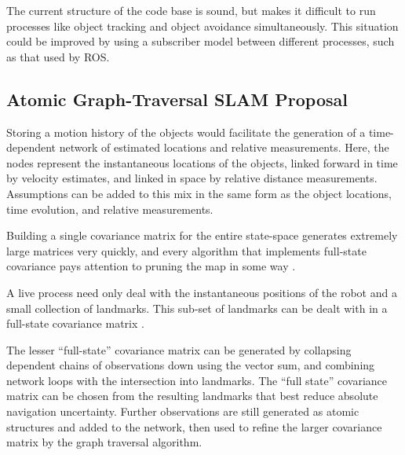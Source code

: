 \documentclass{article}
\begin{document}
  The current structure of the code base is sound, but makes it difficult to run processes like object tracking and object avoidance simultaneously.  This situation could be improved by using a subscriber model between different processes, such as that used by ROS.




  \pagebreak


\renewcommand{\refname}{References}


%


\begin{appendices}
  \section{Atomic Graph-Traversal SLAM Proposal} \label{sec:SLAMproposal}
    
    Storing a motion history of the objects would facilitate the generation of a time-dependent network of estimated locations and relative measurements.
    Here, the nodes represent the instantaneous locations of the objects, linked forward in time by velocity estimates, and linked in space by relative distance measurements.  Assumptions can be added to this mix in the same form as the object locations, time evolution, and relative measurements.

    Building a single covariance matrix for the entire state-space generates extremely large matrices very quickly, and every algorithm that implements full-state covariance pays attention to pruning the map in some way\cite{monoslam} \cite{airshipSLAM}.
    
    A live process need only deal with the instantaneous positions of the robot and a small collection of landmarks. This sub-set of landmarks can be dealt with in a full-state covariance matrix \cite{monoslam}.  
    
    The lesser ``full-state'' covariance matrix can be generated by collapsing dependent chains of observations down using the vector sum, and combining network loops with the intersection into landmarks.  The ``full state'' covariance matrix can be chosen from the resulting landmarks that best reduce absolute navigation uncertainty.  Further observations are still generated as atomic structures and added to the network, then used to refine the larger covariance matrix by the graph traversal algorithm.  


\end{appendices}
\end{document}
